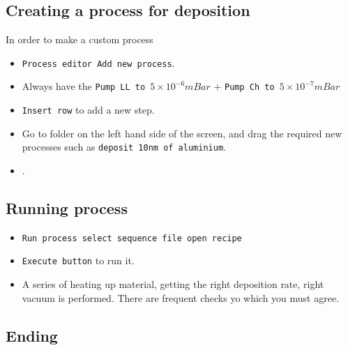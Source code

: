   \subsection{Creating a process for deposition}
   In order to make a custom process
   
   \begin{itemize}
   	\item \texttt{Process editor \ra Add new process}.
   	\item Always have the \texttt{Pump LL to $5\times10^{-6}mBar$} + \texttt{Pump Ch to $5\times10^{-7}mBar$} 
   	\item \texttt{Insert row} to add a new step.
   	\item Go to folder on the left hand side of the screen, and drag the required new processes such as \texttt{deposit 10nm of aluminium}.
   	\item {}.
   \end{itemize}

  \subsection{Running process}
   \begin{itemize}
   	\item \texttt{Run process \ra select sequence \ra file \ra open recipe}
   	\item \texttt{Execute button} to run it.
   	\item A series of heating up material, getting the right deposition rate, right vacuum is performed. There are frequent checks yo which you must agree.
   \end{itemize}

  \subsection{Ending}
 
